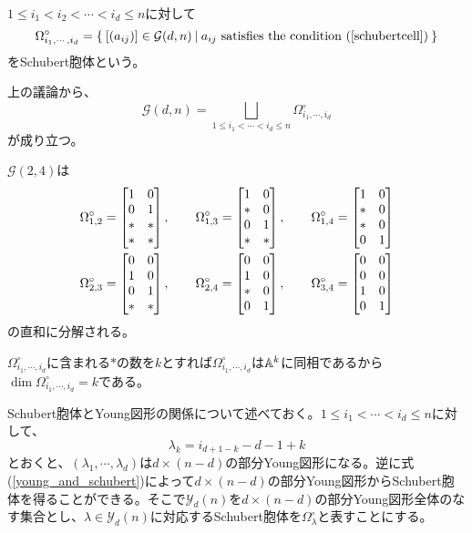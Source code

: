 \documentclass{ltjsreport}
\begin{document}
\begin{defin}
  $1\leq i_1<i_2<\cdots<i_d\leq n$に対して
  \[
  \Omega^\circ_{i_1,\cdots,i_d}=\left\{\:[(a_{ij})]\in\mathcal{G}(d,n)\:\middle|\:a_{ij}\text{ satisfies the condition (\ref{schubertcell})}\:\right\}  
  \]
  をSchubert胞体という。
\end{defin}

上の議論から、
\[
\mathcal{G}(d,n)=\bigsqcup_{1\leq i_1<\cdots<i_d\leq n}\Omega^\circ_{i_1,\cdots,i_d}  
\]
が成り立つ。

\begin{eg}
$\mathcal{G}(2,4)$は
  \begin{align*}
    &\Omega^\circ_{1,2}=\begin{bmatrix} 
      1 & 0\\
      0 & 1\\
      * & *\\
      * & *
     \end{bmatrix},\qquad 
    \Omega^\circ_{1,3}=\begin{bmatrix} 
      1 & 0\\
      * & 0\\
      0 & 1\\
      * & *
     \end{bmatrix},\qquad
    \Omega^\circ_{1,4}=\begin{bmatrix} 
      1 & 0\\
      * & 0\\
      * & 0\\
      0 & 1
     \end{bmatrix}\\
    &\Omega^\circ_{2,3}=\begin{bmatrix} 
      0 & 0\\
      1 & 0\\
      0 & 1\\
      * & *
     \end{bmatrix},\qquad
    \Omega^\circ_{2,4}=\begin{bmatrix} 
      0 & 0\\
      1 & 0\\
      * & 0\\
      0 & 1
     \end{bmatrix},\qquad
    \Omega^\circ_{3,4}=\begin{bmatrix} 
      0 & 0\\
      0 & 0\\
      1 & 0\\
      0 & 1
     \end{bmatrix}
  \end{align*}
  の直和に分解される。
\end{eg}

$\Omega^\circ_{i_1,\cdots,i_d}$に含まれる$*$の数を$k$とすれば$\Omega^\circ_{i_1,\cdots,i_d}$は$\mathbb{A}^k$に同相であるから$\dim\Omega^\circ_{i_1,\cdots,i_d}=k$である。

Schubert胞体とYoung図形の関係について述べておく。$1\leq i_1<\cdots<i_d\leq n$に対して、
\begin{equation}\label{young_and_schubert}
\lambda_{k}=i_{d+1-k}-d-1+k  
\end{equation}
とおくと、$(\lambda_1,\cdots,\lambda_d)$は$d\times (n-d)$の部分Young図形になる。逆に式(\ref{young_and_schubert})によって$d\times (n-d)$の部分Young図形からSchubert胞体を得ることができる。そこで$\mathcal{Y}_d(n)$を$d\times (n-d)$の部分Young図形全体のなす集合とし、$\lambda\in\mathcal{Y}_d(n)$に対応するSchubert胞体を$\Omega^\circ_{\lambda}$と表すことにする。
\end{document}
